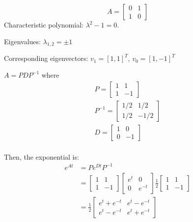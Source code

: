 \documentclass{homework}
\begin{document}
\begin{letterenum}
    \item 
    \begin{equation}
        A = \begin{bmatrix}
            0 & 1 \\ 1 & 0
        \end{bmatrix}
    \end{equation}
    Characteristic polynomial: $\lambda^2 - 1 = 0$.

    Eigenvalues: $\lambda_{1,2} = \pm 1$

    Corresponding eigenvectors: $v_1 = [1, 1]^T$, $v_0 = [1, -1]^T$

    $A = PDP^{-1}$ where
    \begin{align}
        P = \begin{bmatrix}
            1 & 1 \\ 1 & -1
        \end{bmatrix} \\
        P^{-1} = \begin{bmatrix}
            1/2 & 1/2 \\ 1/2 & -1/2
        \end{bmatrix} \\
        D = \begin{bmatrix}
            1 & 0 \\ 0 & -1
        \end{bmatrix} \\
    \end{align}

    Then, the exponential is:
    \begin{align}
        e^{At} &= P e^{Dt} P^{-1} \\
            &= \begin{bmatrix}
                1 & 1 \\ 1 & -1
            \end{bmatrix} \begin{bmatrix}
                e^t & 0 \\ 0 & e^{-t}
            \end{bmatrix} \frac{1}{2} \begin{bmatrix}
                1 & 1 \\ 1 & -1
            \end{bmatrix} \\
            &= \boxed{\frac{1}{2} \begin{bmatrix}
                e^t + e^{-t} & e^t - e^{-t} \\ e^t - e^{-t} & e^t + e^{-t}
            \end{bmatrix}}
    \end{align}


\end{letterenum}
\end{document}
